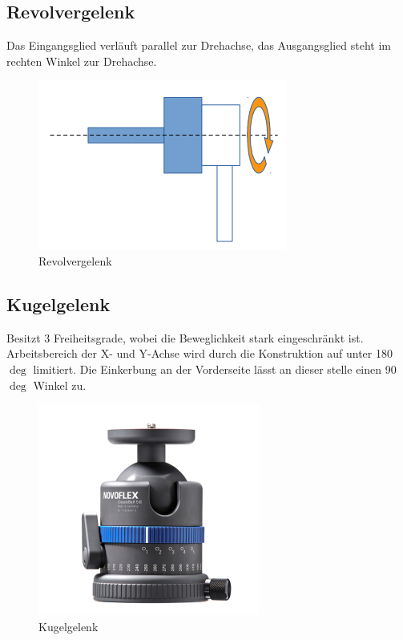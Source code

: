 \subsection{Revolvergelenk}
Das Eingangsglied verläuft parallel zur Drehachse, das Ausgangsglied steht im rechten Winkel zur Drehachse.
\begin{figure}[H]
	\begin{center}
		\includegraphics[scale=0.6]{Resources/PNG/Revolvergelenk}
		\caption{Revolvergelenk}
		\label{fig:Resources/PNG/Revolvergelenk}
	\end{center}
\end{figure}
\subsection{Kugelgelenk}
Besitzt 3 Freiheitsgrade, wobei die Beweglichkeit stark eingeschränkt ist.
Arbeitsbereich der X- und Y-Achse wird durch die Konstruktion auf unter 
180 $\deg$ limitiert.
Die Einkerbung an der Vorderseite lässt an dieser stelle einen 90 $\deg$ Winkel zu.
\begin{figure}[H]
	\begin{center}
		\includegraphics[scale=0.8]{Resources/PNG/Kugelgelenk.PNG}
		\caption{Kugelgelenk}
		\label{fig:Resources/PNG/Kugelgelenk.PNG}
	\end{center}
\end{figure}

